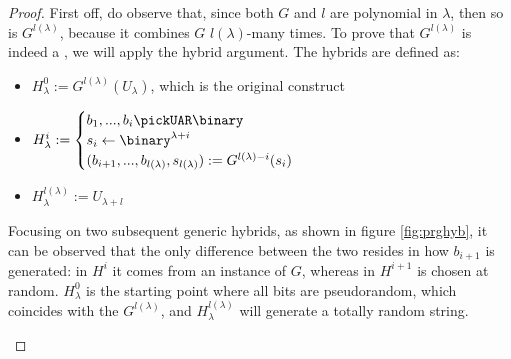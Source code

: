 \begin{proof}

    First off, do observe that, since both $G$ and $l$ are polynomial in $\lambda$, then so is $G^{l(\lambda)}$, because it combines $G$ $l(\lambda)$-many times. To prove that $G^{l(\lambda)}$ is indeed a \prg, we will apply the hybrid argument. The hybrids are defined as:
    \begin{itemize}
        \item $H_{\lambda}^{0} := G^{l(\lambda)}(U_{\lambda})$, which is the original construct
        \item $H_{\lambda}^{i} :=
            \begin{cases}
                b_1 , ..., b_{i} \pickUAR \binary \\
                s_{i} \leftarrow \binary^{\lambda+i} \\
                (b_{i+1}, ..., b_{l(\lambda)}, s_{l(\lambda)}) := G^{l(\lambda)-i}(s_{i})
            \end{cases}$
        \item $H_{\lambda}^{l(\lambda)} := U_{\lambda + l}$
    \end{itemize}

    Focusing on two subsequent generic hybrids, as shown in figure \ref{fig:prghyb}, it can be observed that the only difference between the two resides in how $b_{i + 1}$ is generated: in $H^i$ it comes from an instance of $G$, whereas in $H^{i + 1}$ is chosen at random. $H_\lambda^0$ is the starting point where all bits are pseudorandom, which coincides with the $G^{l(\lambda)}$, and $H_\lambda^{l(\lambda)}$ will generate a totally random string.

    \begin{figure}[h]

\end{figure}
\end{proof}
